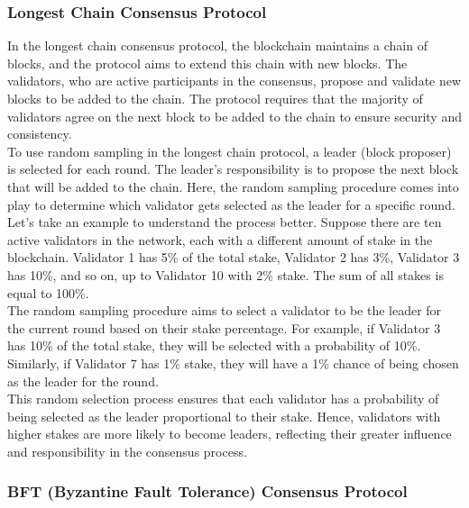 \subsubsection{Longest Chain Consensus Protocol}
In the longest chain consensus protocol, the blockchain maintains a chain of blocks, and the protocol aims to extend this chain with new blocks. The validators, who are active participants in the consensus, propose and validate new blocks to be added to the chain. The protocol requires that the majority of validators agree on the next block to be added to the chain to ensure security and consistency.\\
To use random sampling in the longest chain protocol, a leader (block proposer) is selected for each round. The leader's responsibility is to propose the next block that will be added to the chain. Here, the random sampling procedure comes into play to determine which validator gets selected as the leader for a specific round.\\
Let's take an example to understand the process better. Suppose there are ten active validators in the network, each with a different amount of stake in the blockchain. Validator 1 has 5\% of the total stake, Validator 2 has 3\%, Validator 3 has 10\%, and so on, up to Validator 10 with 2\% stake. The sum of all stakes is equal to 100\%.\\
The random sampling procedure aims to select a validator to be the leader for the current round based on their stake percentage. For example, if Validator 3 has 10\% of the total stake, they will be selected with a probability of 10\%. Similarly, if Validator 7 has 1\% stake, they will have a 1\% chance of being chosen as the leader for the round.\\
This random selection process ensures that each validator has a probability of being selected as the leader proportional to their stake. Hence, validators with higher stakes are more likely to become leaders, reflecting their greater influence and responsibility in the consensus process.

\subsubsection{BFT (Byzantine Fault Tolerance) Consensus Protocol}

